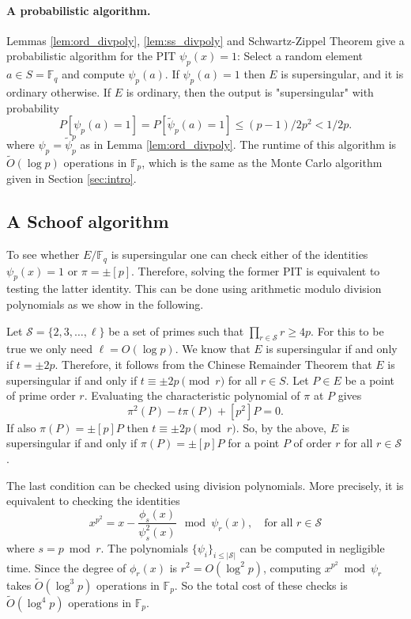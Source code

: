\documentclass[12pt]{article}
\theoremstyle{plain}
\theoremstyle{definition}
\newcommand{\abs}[1]{\left\vert#1\right\vert}
\newcommand{\tildO}{\tilde{O}}
\def\F{\ensuremath{\mathbb{F}}}
\begin{document}
\paragraph{A probabilistic algorithm.}
Lemmas \ref{lem:ord_divpoly}, \ref{lem:ss_divpoly} and Schwartz-Zippel Theorem give a probabilistic 
algorithm for the PIT $\psi_p(x) = 1$: Select a random element $a \in S = \F_q$ and compute 
$\psi_p(a)$. If $\psi_p(a) = 1$ then $E$ is supersingular, and it is ordinary otherwise. If $E$ is 
ordinary, then the output is "supersingular" with probability 
\[ P[\psi_p(a) = 1] = P[\tilde{\psi}_p(a) = 1] \le (p - 1) / 2p^2 < 1 / 2p. \] 
where $\psi_p = \tilde{\psi}_p^p$ as in Lemma \ref{lem:ord_divpoly}. The runtime of this algorithm 
is $\tildO(\log p)$ operations in $\F_p$, which is the same as the Monte Carlo algorithm given in 
Section \ref{sec:intro}.



\subsection{A Schoof algorithm}

To see whether $E/\F_q$ is supersingular one can check either of the identities $\psi_p(x) = 1$ or 
$\pi = \pm [p]$. Therefore, solving the former PIT is equivalent to testing the latter identity. 
This can be done using arithmetic modulo division polynomials as we show in the following. 

Let $\mathcal{S} = \{2, 3, \dots, \ell\}$ be a set of primes such that $\prod_{r \in \mathcal{S}} r 
\ge 4p$. For this to be true we only need $\ell = O(\log p)$. We know that $E$ is supersingular if 
and only if $t = \pm 2p$. Therefore, it follows from the Chinese Remainder Theorem that $E$ is 
supersingular if and only if $t \equiv \pm 2p \pmod{r}$ for all $r \in S$. Let $P \in E$ be a point 
of prime order $r$. Evaluating the characteristic polynomial of $\pi$ at $P$ gives
\[ \pi^2(P) - t\pi(P) + [p^2]P = 0. \]
If also $\pi(P) = \pm [p]P$ then $t \equiv \pm 2p \pmod{r}$. So, by the above, $E$ is supersingular 
if and only if $\pi(P) = \pm [p]P$ for a point $P$ of order $r$ for all $r \in \mathcal{S}$.

The last condition can be checked using division polynomials. More precisely, it is equivalent to 
checking the identities
\begin{equation}
\label{equ:schoof}
	x^{p^2} = x - \frac{\phi_s(x)}{\psi_s^2(x)} ~ \bmod \psi_r(x), \quad \text{for all } r \in 
	\mathcal{S}
\end{equation}
where $s = p \bmod r$. The polynomials $\{ \psi_i \}_{i \le \abs{\mathcal{S}}}$ can be computed in 
negligible 
time. Since the degree of $\phi_r(x)$ is $r^2 = O(\log^2 p)$, computing $x^{p^2} \bmod \psi_r$ 
takes $\tildO(\log^3 p)$ operations in $\F_p$. So the total cost of these checks is $\tildO(\log^4 
p)$ operations in $\F_p$.
\end{document}
